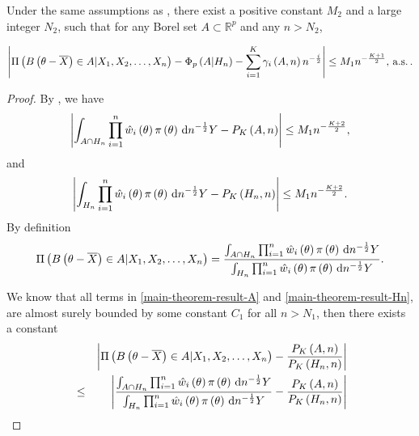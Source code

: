 \begin{thm}
Under the same assumptions as , there exist
a positive constant $M_{2}$ and a large integer $N_{2}$, such that
for any Borel set $A\subset\mathbb{R}^{p}$ and any $n>N_{2}$,%
\begin{comment}
add subscript to constant
\end{comment}
{} 
\begin{equation}
\left|\Pi\left(B\left(\theta-\overline{X}\right)\in A|X_{1},X_{2},\ldots,X_{n}\right)-\Phi_{p}\left(A|H_{n}\right)-\sum_{i=1}^{K}\gamma_{i}\left(A,n\right)n^{-\frac{i}{2}}\right|\le M_{1}n^{-\frac{K+1}{2}},\,\mathrm{a.s.}\,.\label{eq:asym-exp-poster-prob}
\end{equation}

\begin{proof}
By , we have 
\begin{equation}
\left|\int_{A\cap H_{n}}\prod_{i=1}^{n}\hat{w}_{i}\left(\theta\right)\pi\left(\theta\right)\,\mathrm{d} n^{-\frac{1}{2}}Y-P_{K}\left(A,n\right)\right|\le M_{1}n^{-\frac{K+2}{2}},\label{eq:main-theorem-result-A}
\end{equation}
and 
\begin{equation}
\left|\int_{H_{n}}\prod_{i=1}^{n}\hat{w}_{i}\left(\theta\right)\pi\left(\theta\right)\,\mathrm{d} n^{-\frac{1}{2}}Y-P_{K}\left(H_{n},n\right)\right|\le M_{1}n^{-\frac{K+2}{2}}.\label{eq:main-theorem-result-Hn}
\end{equation}
By definition 
\[
\Pi\left(B\left(\theta-\overline{X}\right)\in A|X_{1},X_{2},\ldots,X_{n}\right)=\frac{\int_{A\cap H_{n}}\prod_{i=1}^{n}\hat{w}_{i}\left(\theta\right)\pi\left(\theta\right)\,\mathrm{d} n^{-\frac{1}{2}}Y}{\int_{H_{n}}\prod_{i=1}^{n}\hat{w}_{i}\left(\theta\right)\pi\left(\theta\right)\,\mathrm{d} n^{-\frac{1}{2}}Y}.
\]
\begin{comment}
add more detail in bounded. bounded above and below.
\end{comment}
We know that all terms in \eqref{main-theorem-result-A} and \eqref{main-theorem-result-Hn},
are almost surely bounded by some constant $C_{1}$ for all $n>N_{1}$,
then there exists a constant 
\begin{eqnarray}
 &  & \left|\Pi\left(B\left(\theta-\overline{X}\right)\in A|X_{1},X_{2},\ldots,X_{n}\right)-\frac{P_{K}\left(A,n\right)}{P_{K}\left(H_{n},n\right)}\right|\nonumber \\
 & \le & \left|\frac{\int_{A\cap H_{n}}\prod_{i=1}^{n}\hat{w}_{i}\left(\theta\right)\pi\left(\theta\right)\diff n^{-\frac{1}{2}}Y}{\int_{H_{n}}\prod_{i=1}^{n}\hat{w}_{i}\left(\theta\right)\pi\left(\theta\right)\diff n^{-\frac{1}{2}}Y}-\frac{P_{K}\left(A,n\right)}{P_{K}\left(H_{n},n\right)}\right|\nonumber \\

\end{eqnarray}
\end{proof}
\end{thm}
